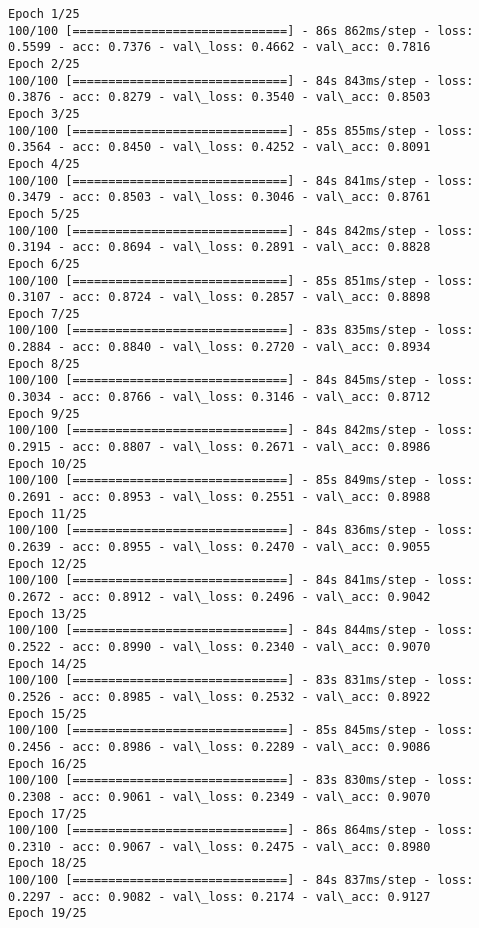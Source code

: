 \documentclass[11pt]{article}
\begin{document}
    \begin{Verbatim}[commandchars=\\\{\}]
Epoch 1/25
100/100 [==============================] - 86s 862ms/step - loss: 0.5599 - acc: 0.7376 - val\_loss: 0.4662 - val\_acc: 0.7816
Epoch 2/25
100/100 [==============================] - 84s 843ms/step - loss: 0.3876 - acc: 0.8279 - val\_loss: 0.3540 - val\_acc: 0.8503
Epoch 3/25
100/100 [==============================] - 85s 855ms/step - loss: 0.3564 - acc: 0.8450 - val\_loss: 0.4252 - val\_acc: 0.8091
Epoch 4/25
100/100 [==============================] - 84s 841ms/step - loss: 0.3479 - acc: 0.8503 - val\_loss: 0.3046 - val\_acc: 0.8761
Epoch 5/25
100/100 [==============================] - 84s 842ms/step - loss: 0.3194 - acc: 0.8694 - val\_loss: 0.2891 - val\_acc: 0.8828
Epoch 6/25
100/100 [==============================] - 85s 851ms/step - loss: 0.3107 - acc: 0.8724 - val\_loss: 0.2857 - val\_acc: 0.8898
Epoch 7/25
100/100 [==============================] - 83s 835ms/step - loss: 0.2884 - acc: 0.8840 - val\_loss: 0.2720 - val\_acc: 0.8934
Epoch 8/25
100/100 [==============================] - 84s 845ms/step - loss: 0.3034 - acc: 0.8766 - val\_loss: 0.3146 - val\_acc: 0.8712
Epoch 9/25
100/100 [==============================] - 84s 842ms/step - loss: 0.2915 - acc: 0.8807 - val\_loss: 0.2671 - val\_acc: 0.8986
Epoch 10/25
100/100 [==============================] - 85s 849ms/step - loss: 0.2691 - acc: 0.8953 - val\_loss: 0.2551 - val\_acc: 0.8988
Epoch 11/25
100/100 [==============================] - 84s 836ms/step - loss: 0.2639 - acc: 0.8955 - val\_loss: 0.2470 - val\_acc: 0.9055
Epoch 12/25
100/100 [==============================] - 84s 841ms/step - loss: 0.2672 - acc: 0.8912 - val\_loss: 0.2496 - val\_acc: 0.9042
Epoch 13/25
100/100 [==============================] - 84s 844ms/step - loss: 0.2522 - acc: 0.8990 - val\_loss: 0.2340 - val\_acc: 0.9070
Epoch 14/25
100/100 [==============================] - 83s 831ms/step - loss: 0.2526 - acc: 0.8985 - val\_loss: 0.2532 - val\_acc: 0.8922
Epoch 15/25
100/100 [==============================] - 85s 845ms/step - loss: 0.2456 - acc: 0.8986 - val\_loss: 0.2289 - val\_acc: 0.9086
Epoch 16/25
100/100 [==============================] - 83s 830ms/step - loss: 0.2308 - acc: 0.9061 - val\_loss: 0.2349 - val\_acc: 0.9070
Epoch 17/25
100/100 [==============================] - 86s 864ms/step - loss: 0.2310 - acc: 0.9067 - val\_loss: 0.2475 - val\_acc: 0.8980
Epoch 18/25
100/100 [==============================] - 84s 837ms/step - loss: 0.2297 - acc: 0.9082 - val\_loss: 0.2174 - val\_acc: 0.9127
Epoch 19/25

\end{Verbatim}
\end{document}
